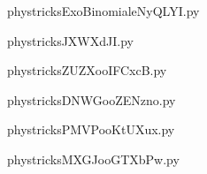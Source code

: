     \newcommand{\CaptionFigExoBinomialeNyQLYI}{<+Type your caption here+>}
    \begin{center}
        
    \end{center}
    phystricksExoBinomialeNyQLYI.py

    

    \clearpage
    


    \newcommand{\CaptionFigJXWXdJI}{<+Type your caption here+>}
    \begin{center}
        
    \end{center}
    phystricksJXWXdJI.py

    

    \clearpage
    


    \newcommand{\CaptionFigZUZXooIFCxcB}{<+Type your caption here+>}
    \begin{center}
        
    \end{center}
    phystricksZUZXooIFCxcB.py

    

    \clearpage
    


    \newcommand{\CaptionFigDNWGooZENzno}{<+Type your caption here+>}
    \begin{center}
        
    \end{center}
    phystricksDNWGooZENzno.py

    

    \clearpage
    


    \newcommand{\CaptionFigPMVPooKtUXux}{<+Type your caption here+>}
    \begin{center}
        
    \end{center}
    phystricksPMVPooKtUXux.py

    

    \clearpage
    


    \newcommand{\CaptionFigMXGJooGTXbPw}{<+Type your caption here+>}
    \begin{center}
        
    \end{center}
    phystricksMXGJooGTXbPw.py

